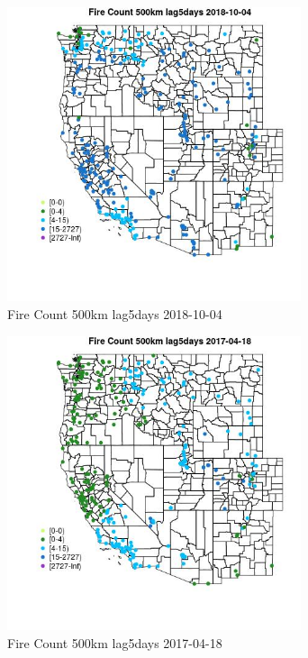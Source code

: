 \begin{figure} 
\centering  
\includegraphics[width=0.77\textwidth]{Code_Outputs/Report_ML_input_PM25_Step4_part_f_de_duplicated_aveswNAs_MapObsFire_Count_500km_lag5days2018-10-04.jpg} 
\caption{\label{fig:Report_ML_input_PM25_Step4_part_f_de_duplicated_aveswNAsMapObsFire_Count_500km_lag5days2018-10-04}Fire Count 500km lag5days 2018-10-04} 
\end{figure} 
 

\clearpage 

\begin{figure} 
\centering  
\includegraphics[width=0.77\textwidth]{Code_Outputs/Report_ML_input_PM25_Step4_part_f_de_duplicated_aveswNAs_MapObsFire_Count_500km_lag5days2017-04-18.jpg} 
\caption{\label{fig:Report_ML_input_PM25_Step4_part_f_de_duplicated_aveswNAsMapObsFire_Count_500km_lag5days2017-04-18}Fire Count 500km lag5days 2017-04-18} 
\end{figure} 
 


